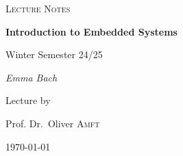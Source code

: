 \begin{titlepage}
	\centering
	{\Large \textsc{Lecture Notes}\par}
	\vspace{0.5cm}
	{\huge\bfseries Introduction to Embedded Systems\par}
	\vspace{1cm}
    {\Large Winter Semester 24/25\par}
    \vspace{1cm}
	{\Large\itshape Emma Bach\par}
	\vfill
	Lecture by\par
	Prof. Dr.~Oliver \textsc{Amft}

	\vfill

	{\large \today\par}
\end{titlepage}

